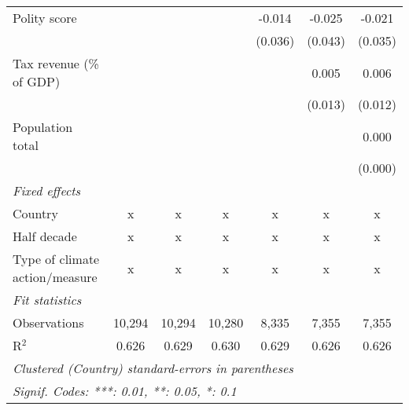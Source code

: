 \begin{tabular}{lcccccc}
   Polity score                                                                &         &               &                & -0.014        & -0.025        & -0.021\\   
                                                                               &         &               &                & (0.036)       & (0.043)       & (0.035)\\   
   Tax revenue (\% of GDP)                                                     &         &               &                &               & 0.005         & 0.006\\   
                                                                               &         &               &                &               & (0.013)       & (0.012)\\   
   Population total                                                            &         &               &                &               &               & 0.000\\   
                                                                               &         &               &                &               &               & (0.000)\\   
   \emph{Fixed effects}\\
   Country                                                                     & x       & x             & x              & x             & x             & x\\  
   Half decade                                                                 & x       & x             & x              & x             & x             & x\\  
   Type of climate action/measure                                              & x       & x             & x              & x             & x             & x\\  
   \midrule \emph{Fit statistics}\\
   Observations                                                                & 10,294  & 10,294        & 10,280         & 8,335         & 7,355         & 7,355\\  
   R$^2$                                                                       & 0.626   & 0.629         & 0.630          & 0.629         & 0.626         & 0.626\\  
   \midrule
   \multicolumn{7}{l}{\emph{Clustered (Country) standard-errors in parentheses}}\\
   \multicolumn{7}{l}{\emph{Signif. Codes: ***: 0.01, **: 0.05, *: 0.1}}\\
\end{tabular}
\par\endgroup


